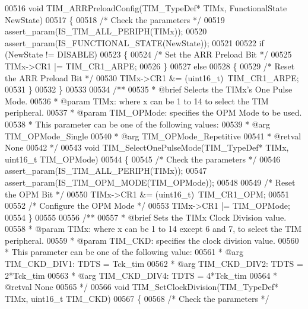 \begin{DoxyCode}
00516 \textcolor{keywordtype}{void} TIM_ARRPreloadConfig(TIM\_TypeDef* TIMx, FunctionalState NewState)
00517 \{
00518   \textcolor{comment}{/* Check the parameters */}
00519   assert_param(IS\_TIM\_ALL\_PERIPH(TIMx));
00520   assert_param(IS\_FUNCTIONAL\_STATE(NewState));
00521 
00522   \textcolor{keywordflow}{if} (NewState != DISABLE)
00523   \{
00524     \textcolor{comment}{/* Set the ARR Preload Bit */}
00525     TIMx->CR1 |= TIM_CR1_ARPE;
00526   \}
00527   \textcolor{keywordflow}{else}
00528   \{
00529     \textcolor{comment}{/* Reset the ARR Preload Bit */}
00530     TIMx->CR1 &= (uint16\_t)~TIM_CR1_ARPE;
00531   \}
00532 \}
00533 
00534 \textcolor{comment}{/**}
00535 \textcolor{comment}{  * @brief  Selects the TIMx's One Pulse Mode.}
00536 \textcolor{comment}{  * @param  TIMx: where x can be 1 to 14 to select the TIM peripheral.}
00537 \textcolor{comment}{  * @param  TIM\_OPMode: specifies the OPM Mode to be used.}
00538 \textcolor{comment}{  *          This parameter can be one of the following values:}
00539 \textcolor{comment}{  *            @arg TIM\_OPMode\_Single}
00540 \textcolor{comment}{  *            @arg TIM\_OPMode\_Repetitive}
00541 \textcolor{comment}{  * @retval None}
00542 \textcolor{comment}{  */}
00543 \textcolor{keywordtype}{void} TIM_SelectOnePulseMode(TIM\_TypeDef* TIMx, uint16\_t TIM\_OPMode)
00544 \{
00545   \textcolor{comment}{/* Check the parameters */}
00546   assert_param(IS\_TIM\_ALL\_PERIPH(TIMx));
00547   assert_param(IS\_TIM\_OPM\_MODE(TIM\_OPMode));
00548 
00549   \textcolor{comment}{/* Reset the OPM Bit */}
00550   TIMx->CR1 &= (uint16\_t)~TIM_CR1_OPM;
00551 
00552   \textcolor{comment}{/* Configure the OPM Mode */}
00553   TIMx->CR1 |= TIM\_OPMode;
00554 \}
00555 
00556 \textcolor{comment}{/**}
00557 \textcolor{comment}{  * @brief  Sets the TIMx Clock Division value.}
00558 \textcolor{comment}{  * @param  TIMx: where x can be 1 to 14 except 6 and 7, to select the TIM peripheral.}
00559 \textcolor{comment}{  * @param  TIM\_CKD: specifies the clock division value.}
00560 \textcolor{comment}{  *          This parameter can be one of the following value:}
00561 \textcolor{comment}{  *            @arg TIM\_CKD\_DIV1: TDTS = Tck\_tim}
00562 \textcolor{comment}{  *            @arg TIM\_CKD\_DIV2: TDTS = 2*Tck\_tim}
00563 \textcolor{comment}{  *            @arg TIM\_CKD\_DIV4: TDTS = 4*Tck\_tim}
00564 \textcolor{comment}{  * @retval None}
00565 \textcolor{comment}{  */}
00566 \textcolor{keywordtype}{void} TIM_SetClockDivision(TIM\_TypeDef* TIMx, uint16\_t TIM\_CKD)
00567 \{
00568   \textcolor{comment}{/* Check the parameters */}

\end{DoxyCode}
